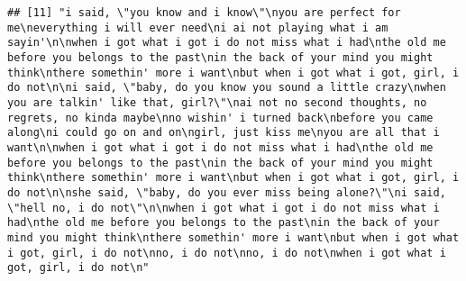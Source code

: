 \documentclass[]{article}
\begin{document}
\begin{verbatim}
## [11] "i said, \"you know and i know\"\nyou are perfect for me\neverything i will ever need\ni ai not playing what i am sayin'\n\nwhen i got what i got i do not miss what i had\nthe old me before you belongs to the past\nin the back of your mind you might think\nthere somethin' more i want\nbut when i got what i got, girl, i do not\n\ni said, \"baby, do you know you sound a little crazy\nwhen you are talkin' like that, girl?\"\nai not no second thoughts, no regrets, no kinda maybe\nno wishin' i turned back\nbefore you came along\ni could go on and on\ngirl, just kiss me\nyou are all that i want\n\nwhen i got what i got i do not miss what i had\nthe old me before you belongs to the past\nin the back of your mind you might think\nthere somethin' more i want\nbut when i got what i got, girl, i do not\n\nshe said, \"baby, do you ever miss being alone?\"\ni said, \"hell no, i do not\"\n\nwhen i got what i got i do not miss what i had\nthe old me before you belongs to the past\nin the back of your mind you might think\nthere somethin' more i want\nbut when i got what i got, girl, i do not\nno, i do not\nno, i do not\nwhen i got what i got, girl, i do not\n"                                                                                                                                                                                                                                                                                                                                                                                                                                                                                                                                                                                                                                                                                                                                                                                                                                                                                                                                                                                                                                                                                                                                                                                                                                                                                                                                                                                                                                                                                                                                                                                                                                                                                                                                                                        

\end{verbatim}
\end{document}
